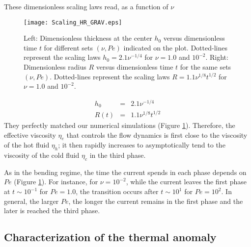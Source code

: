 These dimensionless scaling laws read, as a function of $\nu$
\begin{figure}
  \begin{center}
    \graphicspath{ {/Users/thorey/Documents/These/Projet/Refroidissement/Skin_Model/Figure/JFM_V13/} }
    \texttt{[image: Scaling\_HR\_GRAV.eps]}
    \caption{Left: Dimensionless thickness at  the center $h_0$ versus
      dimensionless time  $t$ for different sets  $(\nu,Pe)$ indicated
      on   the  plot.    Dotted-lines  represent   the  scaling   laws
      $h_0=  2.1\nu^{-1/4}$ for  $\nu  = 1.0$  and $10^{-2}$.   Right:
      Dimensionless radius  $R$ versus dimensionless time  $t$ for the
      same sets  $(\nu,Pe)$.  Dotted-lines represent the  scaling laws
      $R= 1.1\nu^{1/8}t^{1/2}$ for $\nu = 1.0$ and $10^{-2}$.}
    \label{Scaling_HR_GRAV}
  \end{center}
\end{figure}
\begin{eqnarray}
  h_0 &=& 2.1\nu^{-1/4}\label{scaling-H-gravi-2}\\
  R(t) &=& 1.1\nu^{1/8} t^{1/2}\label{scaling-R-gravi-2}
\end{eqnarray}
They   perfectly    matched   our   numerical    simulations   (Figure
\ref{Scaling_HR_GRAV}).  Therefore,  the effective  viscosity $\eta_e$
that controls the flow dynamics is first close to the viscosity of the
hot fluid $\eta_h$;  it then rapidly increases  to asymptotically tend
to the viscosity of the cold fluid $\eta_c$ in the third phase.

As in  the bending regime, the  time the current spends  in each phase
depends on $Pe$ (Figure \ref{Scaling_HR_GRAV}).  For
instance, for $\nu=10^{-2}$, while the  current leaves the first phase
at  $t\sim10^{-1}$   for  $Pe=  1.0$,  the   transition  occurs  after
$t \sim 10^1$ for $Pe=10^2$.  In  general, the larger $Pe$, the longer
the current  remains in the first  phase and the later  is reached the
third phase.

\subsection{Characterization of the thermal anomaly}
\label{sec:char-therm-anom-g}

